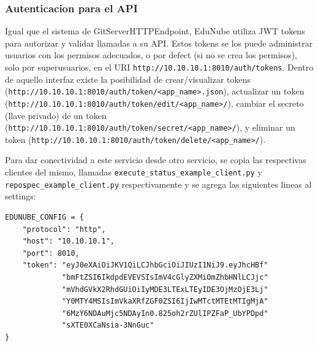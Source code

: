 \subsubsection{Autenticacion para el API}
Igual que el sistema de GitServerHTTPEndpoint, EduNube utiliza JWT tokens para autorizar y validar llamadas a su API. Estos tokens se los puede administrar usuarios con los permisos adecuados, o por defect (si no se crea los permisos), solo por superusuarios, en el URI \texttt{http://10.10.10.1:8010/auth/tokens}. Dentro de aquello interfaz existe la posibilidad de crear/visualizar tokens \\
(\texttt{http://10.10.10.1:8010/auth/token/<app\_name>.json}), actualizar un token (\texttt{http://10.10.10.1:8010/auth/token/edit/<app\_name>/}), cambiar el secreto (llave privado) de un token\\
(\texttt{http://10.10.10.1:8010/auth/token/secret/<app\_name>/}), y eliminar un token (\texttt{http://10.10.10.1:8010/auth/token/delete/<app\_name>/}).

Para dar conectividad a este servicio desde otro servicio, se copia las respectivas clientes del mismo, llamadas \texttt{execute\_status\_example\_client.py} y \\
\texttt{repospec\_example\_client.py} respectivamente y se agrega las siguientes lineas al settings:
\lstset{language=Python}
\begin{lstlisting}
EDUNUBE_CONFIG = {
    "protocol": "http",
    "host": "10.10.10.1",
    "port": 8010,
    "token": "eyJ0eXAiOiJKV1QiLCJhbGciOiJIUzI1NiJ9.eyJhcHBf"
             "bmFtZSI6IkdpdEVEVSIsImV4cGlyZXMiOmZhbHNlLCJjc"
             "mVhdGVkX2RhdGUiOiIyMDE3LTExLTEyIDE3OjMzOjE3Lj"
             "Y0MTY4MSIsImVkaXRfZGF0ZSI6IjIwMTctMTEtMTIgMjA"
             "6MzY6NDAuMjc5NDAyIn0.825oh2rZUlIPZFaP_UbYPDpd"
             "sXTE0XCaNsia-3NnGuc"
}
\end{lstlisting}

